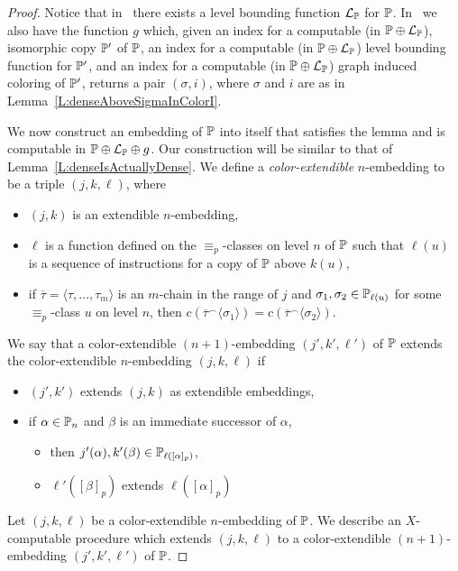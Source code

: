 \begin{proof}
Notice that in \ACAo\ there exists a level bounding function $\mathcal{L}_{\mathbb{P}}$ for $\mathbb{P}$.
In \ACAo\ we also have the function $g$ which,
given an index for a computable (in $\mathbb{P}\oplus\mathcal{L}_{\mathbb{P}}$), isomorphic copy $\mathbb{P}'$ of $\mathbb{P}$,
an index for a computable (in $\mathbb{P}\oplus\mathcal{L}_{\mathbb{P}}$) level bounding function for $\mathbb{P}'$,
and an index for a computable (in $\mathbb{P}\oplus\mathcal{L}_{\mathbb{P}}$) graph induced coloring of $\mathbb{P}'$,
returns a pair $(\sigma,i)$, where $\sigma$ and $i$ are as in Lemma~\ref{L:denseAboveSigmaInColorI}.

We now construct an embedding of $\mathbb{P}$ into itself that satisfies the lemma
and is computable in $\mathbb{P}\oplus\mathcal{L}_{\mathbb{P}}\oplus g$.
Our construction will be similar to that of Lemma~\ref{L:denseIsActuallyDense}.
We define a \textit{color-extendible} $n$-embedding to be a triple $(j,k,\ell)$, where
\begin{itemize}
\item $(j,k)$ is an extendible $n$-embedding,
\item $\ell$ is a function defined on the $\equiv_p$-classes on level $n$ of $\mathbb{P}$
such that $\ell(u)$ is a sequence of instructions for a copy of $\mathbb{P}$ above $k(u)$,
\item if $\overline{\tau}=\langle \tau,\ldots,\tau_m\rangle$ is an $m$-chain in the range of $j$
	and $\sigma_1,\sigma_2\in\mathbb{P}_{\ell(u)}$ for some $\equiv_p$-class $u$ on level $n$,
	then $c(\overline{\tau}^\frown\langle\sigma_1\rangle)=c(\overline{\tau}^\frown\langle\sigma_2\rangle)$.
\end{itemize}

We say that a color-extendible $(n+1)$-embedding $(j',k',\ell')$ of $\mathbb{P}$
extends the color-extendible $n$-embedding $(j,k,\ell)$ if
\begin{itemize}
\item $(j',k')$ extends $(j,k)$ as extendible embeddings,
\item if $\alpha\in\mathbb{P}_n$ and $\beta$ is an immediate successor of $\alpha$,
	\begin{itemize}
	\item then $j'(\alpha),k'(\beta)\in \mathbb{P}_{\ell([\alpha]_p)}$,
	\item $\ell'([\beta]_p)$ extends $\ell([\alpha]_p)$
	\end{itemize}
\end{itemize}

Let $(j,k,\ell)$ be a color-extendible $n$-embedding of $\mathbb{P}$.
We describe an $X$-computable procedure which extends $(j,k,\ell)$ to a
color-extendible $(n+1)$-embedding $(j',k',\ell')$ of $\mathbb{P}$.


\end{proof}
